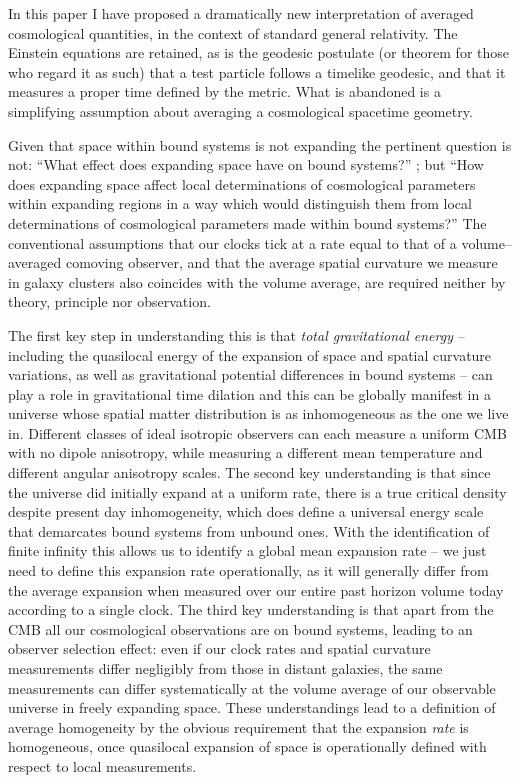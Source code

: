 \documentclass[12pt]{iopart}
\begin{document}
In this paper I have proposed a dramatically new interpretation of averaged
cosmological quantities, in the context of standard general relativity.
The Einstein equations are retained, as is the geodesic postulate
(or theorem for those who regard it as such) that a test particle follows
a timelike geodesic, and that it measures a proper time defined by the
metric. What is abandoned is a simplifying assumption about
averaging a cosmological spacetime geometry.

Given that space within bound systems is not expanding the pertinent question
is not: ``What effect does expanding space have on bound systems?''
\cite{gruyere}; but ``How does expanding space affect local determinations
of cosmological parameters within expanding regions in a way which would
distinguish them from local determinations of cosmological parameters made
within bound systems?'' The conventional assumptions
that our clocks tick at a rate equal to that of a volume--averaged
comoving observer, and that the average spatial curvature we measure in galaxy
clusters also coincides with the volume average, are required neither by
theory, principle nor observation.

The first key step in understanding this is that {\em total gravitational
energy} -- including the quasilocal energy of the expansion of space and
spatial curvature variations, as well as gravitational potential differences
in bound systems -- can play a role in gravitational time dilation and this
can be globally manifest in a universe whose spatial matter distribution is
as inhomogeneous as the one we live in. Different classes of ideal isotropic
observers can each measure a uniform CMB with no dipole anisotropy, while
measuring a different mean temperature and different angular anisotropy
scales.
The second key understanding is that since the universe did initially expand
at a uniform rate, there is a true critical density despite present day
inhomogeneity, which does define a universal energy scale that demarcates
bound systems from unbound ones. With the identification of finite infinity
this allows us to identify a global mean expansion rate -- we just
need to define this expansion rate operationally, as it will generally
differ from the average expansion when measured over our entire past horizon
volume today according to a single clock. The
third key understanding is that apart from the CMB all our cosmological
observations are on bound systems, leading to an observer selection effect:
even if our clock rates and spatial curvature measurements differ negligibly
from those in distant galaxies, the same measurements can differ
systematically at the volume average of our
observable universe in freely expanding space. These understandings lead to a
definition of average homogeneity by the obvious requirement that
the expansion {\em rate} is homogeneous, once quasilocal expansion of space
is operationally defined with respect to local measurements.
\end{document}
